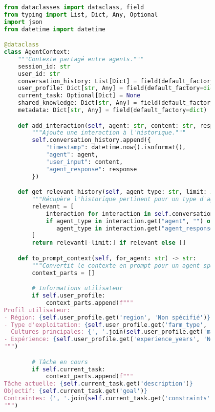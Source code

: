 \begin{figure}[H]
\centering
\begin{lstlisting}[language=Python, caption=Système de gestion du contexte inter-agents]
from dataclasses import dataclass, field
from typing import List, Dict, Any, Optional
import json
from datetime import datetime

@dataclass
class AgentContext:
    """Contexte partagé entre agents."""
    session_id: str
    user_id: str
    conversation_history: List[Dict] = field(default_factory=list)
    user_profile: Dict[str, Any] = field(default_factory=dict)
    current_task: Optional[Dict] = None
    shared_knowledge: Dict[str, Any] = field(default_factory=dict)
    metadata: Dict[str, Any] = field(default_factory=dict)

    def add_interaction(self, agent: str, content: str, response: str):
        """Ajoute une interaction à l'historique."""
        self.conversation_history.append({
            "timestamp": datetime.now().isoformat(),
            "agent": agent,
            "user_input": content,
            "agent_response": response
        })

    def get_relevant_history(self, agent_type: str, limit: int = 5) -> List[Dict]:
        """Récupère l'historique pertinent pour un type d'agent."""
        relevant = [
            interaction for interaction in self.conversation_history
            if agent_type in interaction.get("agent", "") or
               agent_type in interaction.get("agent_response", "")
        ]
        return relevant[-limit:] if relevant else []

    def to_prompt_context(self, for_agent: str) -> str:
        """Convertit le contexte en prompt pour un agent spécifique."""
        context_parts = []

        # Informations utilisateur
        if self.user_profile:
            context_parts.append(f"""
Profil utilisateur:
- Région: {self.user_profile.get('region', 'Non spécifié')}
- Type d'exploitation: {self.user_profile.get('farm_type', 'Non spécifié')}
- Cultures principales: {', '.join(self.user_profile.get('main_crops', []))}
- Expérience: {self.user_profile.get('experience_years', 'Non spécifié')} ans
""")

        # Tâche en cours
        if self.current_task:
            context_parts.append(f"""
Tâche actuelle: {self.current_task.get('description')}
Objectif: {self.current_task.get('goal')}
Contraintes: {', '.join(self.current_task.get('constraints', []))}
""")


\end{lstlisting}
\end{figure}
